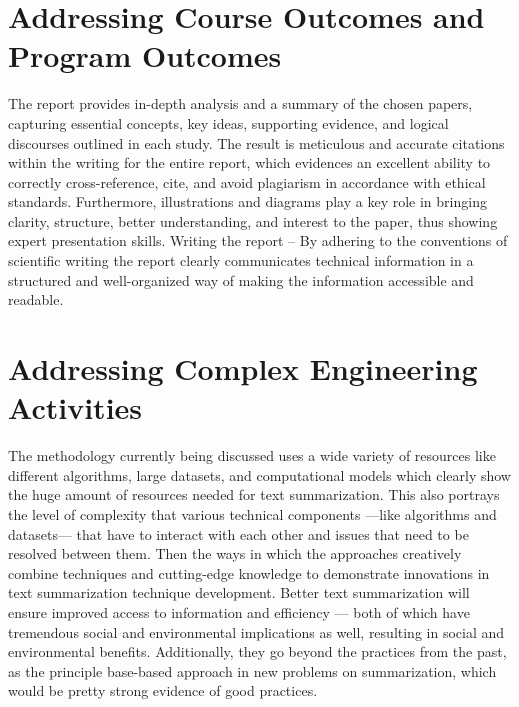 \documentclass[12pt]{report}
\begin{document}
\section*{Addressing Course Outcomes and Program Outcomes}
The report provides in-depth analysis and a summary of the chosen papers, capturing essential concepts, key ideas, supporting evidence, and logical discourses outlined in each study. The result is meticulous and accurate citations within the writing for the entire report, which evidences an excellent ability to correctly cross-reference, cite, and avoid plagiarism in accordance with ethical standards. Furthermore, illustrations and diagrams play a key role in bringing clarity, structure, better understanding, and interest to the paper, thus showing expert presentation skills. Writing the report – By adhering to the conventions of scientific writing the report clearly communicates technical information in a structured and well-organized way of making the information accessible and readable.

\section*{Addressing Complex Engineering Activities}
The methodology currently being discussed uses a wide variety of resources like different algorithms, large datasets, and computational models which clearly show the huge amount of resources needed for text summarization. This also portrays the level of complexity that various technical components —like algorithms and datasets— that have to interact with each other and issues that need to be resolved between them. Then the ways in which the approaches creatively combine techniques and cutting-edge knowledge to demonstrate innovations in text summarization technique development. Better text summarization will ensure improved access to information and efficiency — both of which have tremendous social and environmental implications as well, resulting in social and environmental benefits. Additionally, they go beyond the practices from the past, as the principle base-based approach in new problems on summarization, which would be pretty strong evidence of good practices.

\end{document}
